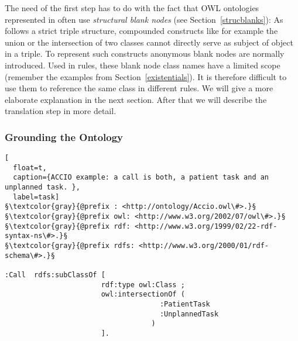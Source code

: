 The need of the first step has to do with the fact that 
OWL ontologies represented in \rdf often use \emph{structural blank nodes} (see Section~\ref{strucblanks}):
As \rdf follows a strict triple structure, compounded constructs like for example the union or the intersection of two classes cannot directly serve as subject of object in a triple. 
To represent such constructs anonymous blank nodes are normally introduced.
Used in rules, 
these blank node class names have a 
limited scope (remember the examples from Section~\ref{existentials}). It is therefore difficult to use them to reference the same class in different rules. 
We will give a more elaborate explanation in the next section. 
After that we will describe the translation step in more detail.



\subsubsection{Grounding the Ontology}
\begin{lstlisting}[
  float=t,
  caption={ACCIO example: a call is both, a patient task and an unplanned task. },
  label=task]
§\textcolor{gray}{@prefix : <http://ontology/Accio.owl\#>.}§
§\textcolor{gray}{@prefix owl: <http://www.w3.org/2002/07/owl\#>.}§
§\textcolor{gray}{@prefix rdf: <http://www.w3.org/1999/02/22-rdf-syntax-ns\#>.}§
§\textcolor{gray}{@prefix rdfs: <http://www.w3.org/2000/01/rdf-schema\#>.}§

:Call  rdfs:subClassOf [ 
                       rdf:type owl:Class ;
                       owl:intersectionOf ( 
                                     :PatientTask
                                     :UnplannedTask
                                   )
                       ].
\end{lstlisting}


